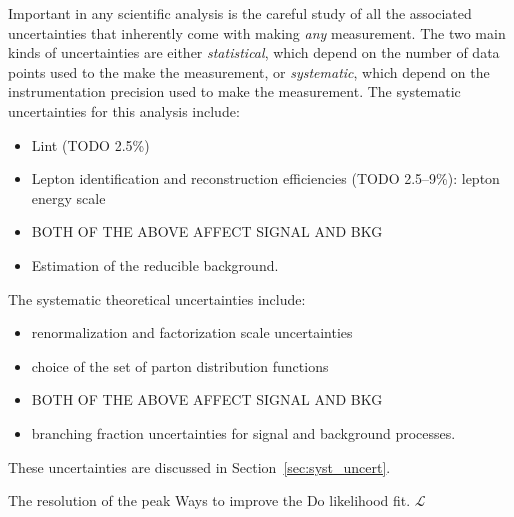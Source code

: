 
Important in any scientific analysis is the careful study of all the associated uncertainties that inherently come with making \emph{any} measurement.
The two main kinds of uncertainties are either \emph{statistical}, which depend on the number of data points used to the make the measurement, or \emph{systematic}, which depend on the instrumentation precision used to make the measurement.
The systematic uncertainties for this analysis include:
\begin{itemize}
	\item Lint (TODO 2.5\%)
	\item Lepton identification and reconstruction efficiencies (TODO 2.5--9\%): lepton energy scale
	\item BOTH OF THE ABOVE AFFECT SIGNAL AND BKG
	\item Estimation of the reducible background.
\end{itemize}
The systematic theoretical uncertainties include:
\begin{itemize}
	\item renormalization and factorization scale uncertainties
	\item choice of the set of parton distribution functions
	\item BOTH OF THE ABOVE AFFECT SIGNAL AND BKG
	\item branching fraction uncertainties for signal and background processes.
\end{itemize}
These uncertainties are discussed in Section~\ref{sec:syst_uncert}.

The resolution of the peak 
Ways to improve the 
Do likelihood fit.
$\mathcal{L}$